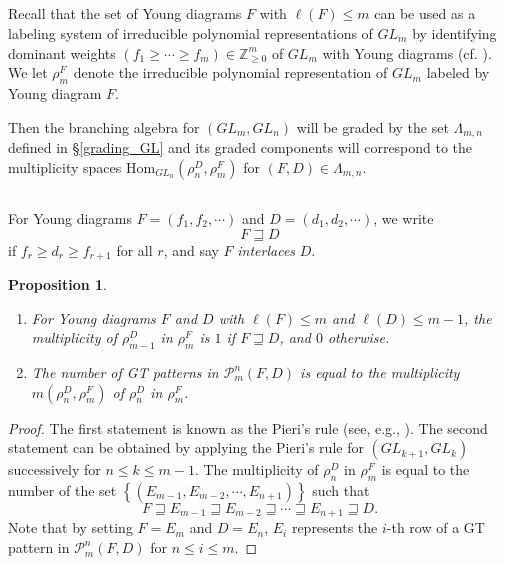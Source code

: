\documentclass[11pt]{amsart}
\numberwithin{equation}{subsection}
\newtheorem{proposition}[theorem]{Proposition}
\begin{document}
\subsection{}

Recall that the set of Young diagrams $F$ with $\ell (F)\leq m$ can be used
as a labeling system of irreducible polynomial representations of ${GL}_{m}$
by identifying dominant weights $(f_{1} \geq \cdots \geq f_{m})\in \mathbb{Z}_{\geq 0}^{m}$
of ${GL}_{m}$ with Young diagrams (cf. \cite[\S 3.1.4]{GW09}). 
We let $\rho _{m}^{F}$ denote the irreducible 
polynomial representation of ${GL}_{m}$ labeled by Young diagram $F$. 

Then the branching algebra for $({GL}_{m},{GL}_{n})$ will be
graded by the set $\Lambda _{m,n}$ defined in \S \ref{grading_GL} and its
graded components will correspond to the multiplicity spaces 
$\mathrm{Hom}_{{GL}_{n}}(\rho _{n}^{D},\rho _{m}^{F})$ for 
$(F,D)\in \Lambda _{m,n}$.


\subsection{}

For Young diagrams $F=(f_{1},f_{2},\cdots )$ and $D=(d_{1},d_{2},\cdots )$,
we write $$F\sqsupseteq D$$ 
if $f_{r}\geq d_{r}\geq f_{r+1}$ for all $r$, and say  $F$ \textit{interlaces} $D$.

\begin{proposition}\label{number of Patterns}
\begin{enumerate}
\item For Young diagrams $F$ and $D$ with 
$\ell(F)\leq m$ and $\ell (D)\leq m-1$, the multiplicity of $\rho _{m-1}^{D}$ in 
$\rho _{m}^{F}$ is $1$ if $F\sqsupseteq D$, and $0$ otherwise.

\item The number of GT patterns in $\mathcal{P}_{m}^{n}(F,D)$ is equal to the
multiplicity $m(\rho _{n}^{D},\rho _{m}^{F})$ of $\rho _{n}^{D}$ in 
$\rho_{m}^{F}$.
\end{enumerate}
\end{proposition}

\begin{proof}
The first statement is known as the Pieri's rule (see, e.g., \cite[\S 8.1.1]{GW09}). 
The second statement can be obtained by applying the Pieri's
rule for $({GL}_{k+1},{GL}_{k})$ successively for $n\leq k\leq m-1$. The
multiplicity of $\rho _{n}^{D}$ in $\rho _{m}^{F}$ is equal to the number of
the set $\left\{ (E_{m-1},E_{m-2},\cdots ,E_{n+1})\right\} $ such that
\begin{equation*}
F\sqsupseteq E_{m-1}\sqsupseteq E_{m-2}\sqsupseteq \cdots \sqsupseteq
E_{n+1}\sqsupseteq D.
\end{equation*}
Note that by setting $F=E_{m}$ and $D=E_{n}$, $E_{i}$ represents the $i$-th
row of a GT pattern in $\mathcal{P}_{m}^{n}(F,D)$ for $n\leq i\leq m$.
\end{proof}
\end{document}
